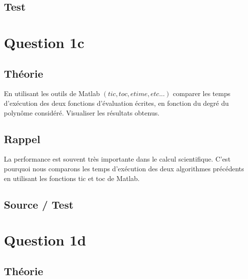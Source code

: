 \documentclass[a4paper,10pt]{report}
\begin{document}
\subsection*{Test}

\begin{center}
%	
\end{center}

\section*{Question 1c}

\subsection*{Théorie}

En utilisant les outils de Matlab $(tic, toc, etime, etc...)$ comparer les temps
d’exécution des deux fonctions d’évaluation écrites, en fonction du degré
du polynôme considéré. Visualiser les résultats obtenus.

\subsection*{Rappel}

La performance est souvent très importante dans le calcul scientifique. C’est pourquoi nous comparons les temps d’exécution des deux algorithmes précédents en utilisant les fonctions tic et toc de Matlab.

\subsection*{Source / Test}

\begin{center}
%	
\end{center}

\section*{Question 1d}

\subsection*{Théorie}
\end{document}
